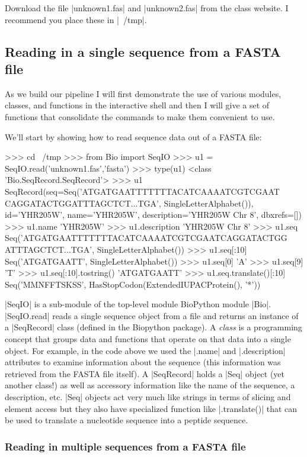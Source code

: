 \documentclass[10pt,letterpaper]{scrartcl}
\begin{document}
Download the file |unknown1.fas| and |unknown2.fas| from the class website. I recommend you place these in |~/tmp|.


\subsection*{Reading in a single sequence from a FASTA file}

As we build our pipeline I will first demonstrate the use of various modules, classes, and functions in the interactive shell and then I will give a set of functions that consolidate the commands to make them convenient to use.  

We'll start by showing how to read sequence data out of a FASTA file:
\begin{python}
>>> cd ~/tmp
>>> from Bio import SeqIO
>>> u1 = SeqIO.read('unknown1.fas','fasta')
>>> type(u1)
<class 'Bio.SeqRecord.SeqRecord'>
>>> u1
SeqRecord(seq=Seq('ATGATGAATTTTTTTACATCAAAATCGTCGAAT
CAGGATACTGGATTTAGCTCT...TGA', SingleLetterAlphabet()), 
id='YHR205W', name='YHR205W', description='YHR205W  Chr 8', dbxrefs=[])
>>> u1.name
'YHR205W'
>>> u1.description
'YHR205W  Chr 8'
>>> u1.seq
Seq('ATGATGAATTTTTTTACATCAAAATCGTCGAATCAGGATACTGG
ATTTAGCTCT...TGA', SingleLetterAlphabet())
>>> u1.seq[:10]
Seq('ATGATGAATT', SingleLetterAlphabet())
>>> u1.seq[0]
'A'
>>> u1.seq[9]
'T'
>>> u1.seq[:10].tostring()
'ATGATGAATT'
>>> u1.seq.translate()[:10]
Seq('MMNFFTSKSS', HasStopCodon(ExtendedIUPACProtein(), '*'))
\end{python}

|SeqIO| is a sub-module of the top-level module BioPython module |Bio|.  |SeqIO.read| reads a single sequence object from a file and returns an instance of a |SeqRecord| class (defined in the Biopython package). A \emph{class} is a programming concept that groups data and functions that operate on that data into a single object. For example, in the code above we used the |.name| and |.description| attributes to examine information about the sequence (this information was retrieved from the FASTA file itself).  A |SeqRecord| holds a |Seq| object (yet another class!) as well as accessory information like the name of the sequence, a description, etc. |Seq| objects act very much like strings in terms of slicing and element access but they also have specialized function like |.translate()| that can be used to translate a nucleotide sequence into a peptide sequence. 

\subsubsection*{Reading in multiple sequences from a FASTA file}
\end{document}

